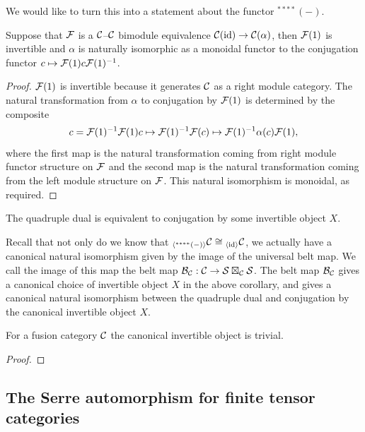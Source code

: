 \documentclass{amsart}
\begin{document}
We would like to turn this into a statement about the functor ${}^{****}(-)$.

\begin{lemma}
Suppose that $\mathcal F$ is a $\mathcal C$--$\mathcal C$ bimodule equivalence $\mathcal C(\mathrm{id}) \rightarrow \mathcal C(\alpha)$, then $\mathcal F(1)$ is invertible and $\alpha$ is naturally isomorphic as a monoidal functor to the conjugation functor $c \mapsto \mathcal F(1) c \mathcal F(1)^{-1}$.  
\end{lemma}
\begin{proof}
$\mathcal F(1)$ is invertible because it generates $\mathcal C$ as a right module category.  The natural transformation from $\alpha$ to conjugation by $\mathcal F(1)$ is determined by the composite $$c = \mathcal F(1)^{-1} \mathcal F(1) c \mapsto \mathcal F(1)^{-1} \mathcal F(c) \mapsto \mathcal F(1)^{-1} \alpha(c) \mathcal F(1),$$ where the first map is the natural transformation coming from right module functor structure on $\mathcal F$ and the second map is the natural transformation coming from the left module structure on $\mathcal F$.  This natural isomorphism is monoidal, as required.  
\end{proof}

\begin{corollary}
The quadruple dual is equivalent to conjugation by some invertible object $X$.
\end{corollary}

Recall that not only do we know that ${}_{\langle{}^{****}(-)\rangle} \mathcal C \cong {}_{\langle\mathrm{id}\rangle}\mathcal C$, we actually have a canonical natural isomorphism given by the image of the universal belt map.  We call the image of this map the belt map $\mathcal B_\mathcal C: \mathcal C \rightarrow \mathcal S \boxtimes_\mathcal C \mathcal S$.  The belt map $\mathcal B_\mathcal C$ gives a canonical choice of invertible object $X$ in the above corollary, and gives a canonical natural isomorphism between the quadruple dual and conjugation by the canonical invertible object $X$.

\begin{theorem} 
For a fusion category $\mathcal C$ the canonical invertible object is trivial.
\end{theorem}
\begin{proof}
\end{proof}

\subsection{The Serre automorphism for finite tensor categories}
\end{document}
